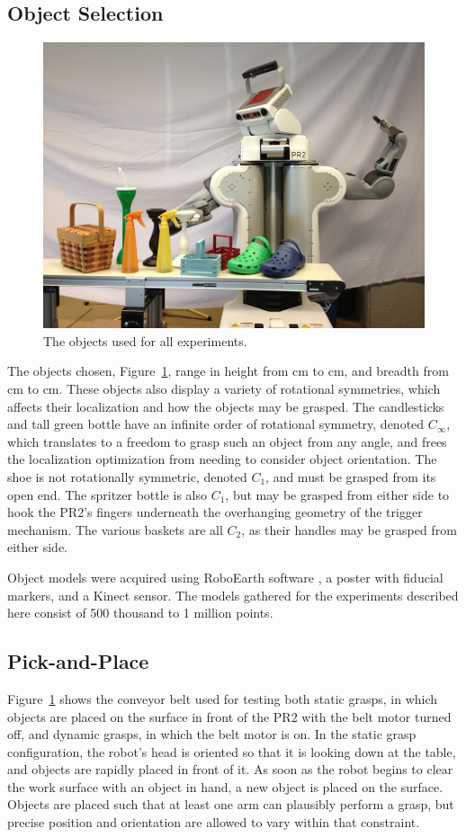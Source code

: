 \documentclass[letterpaper, 10 pt, conference]{ieeeconf}  %
\begin{document}
\subsection{Object Selection}
\begin{figure}[t]
\centering
\includegraphics[width=0.8\columnwidth]{figures/object-group-photo-sm.jpg}
\caption{
The objects used for all experiments.
}
\label{fig:group-photo}
\end{figure}

The objects chosen, Figure~\ref{fig:group-photo}, range in height from
\unit[15]{cm} to \unit[45]{cm}, and breadth from \unit[8]{cm} to
\unit[25]{cm}. These objects also display a variety of rotational
symmetries, which affects their localization and how the objects may
be grasped. The candlesticks and tall green bottle have an infinite
order of rotational symmetry, denoted $C_\infty$, which translates to
a freedom to grasp such an object from any angle, and frees the
localization optimization from needing to consider object
orientation. The shoe is not rotationally symmetric, denoted $C_1$,
and must be grasped from its open end. The spritzer bottle is also
$C_1$, but may be grasped from either side to hook the PR2's fingers
underneath the overhanging geometry of the trigger mechanism. The
various baskets are all $C_2$, as their handles may be grasped from
either side.

Object models were acquired using RoboEarth software
\cite{DiMarco2012:RoboEarthModel}, a poster with fiducial markers, and
a Kinect sensor. The models gathered for the experiments described
here consist of 500 thousand to 1 million points.

\subsection{Pick-and-Place}
Figure~\ref{fig:group-photo} shows the conveyor belt used for testing
both static grasps, in which objects are placed on the surface in
front of the PR2 with the belt motor turned off, and dynamic grasps,
in which the belt motor is on. In the static grasp configuration, the
robot's head is oriented so that it is looking down at the table, and
objects are rapidly placed in front of it. As soon as the robot begins
to clear the work surface with an object in hand, a new object is
placed on the surface. Objects are placed such that at least one arm
can plausibly perform a grasp, but precise position and orientation
are allowed to vary within that constraint.
\end{document}
